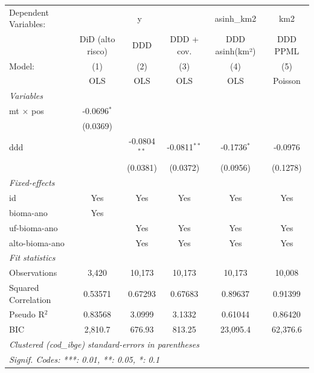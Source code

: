 
\begingroup
\centering
\begin{tabular}{lccccc}
   \tabularnewline \midrule \midrule
   Dependent Variables: & \multicolumn{3}{c}{y} & asinh\_km2 & km2\\
                       & DiD (alto risco) & DDD            & DDD + cov.     & DDD asinh(km²) & DDD PPML \\   
   Model:              & (1)              & (2)            & (3)            & (4)            & (5)\\  
                       &  OLS             & OLS            & OLS            & OLS            & Poisson\\  
   \midrule
   \emph{Variables}\\
   mt $\times$ pos     & -0.0696$^{*}$    &                &                &                &   \\   
                       & (0.0369)         &                &                &                &   \\   
   ddd                 &                  & -0.0804$^{**}$ & -0.0811$^{**}$ & -0.1736$^{*}$  & -0.0976\\   
                       &                  & (0.0381)       & (0.0372)       & (0.0956)       & (0.1278)\\   
   \midrule
   \emph{Fixed-effects}\\
   id                  & Yes              & Yes            & Yes            & Yes            & Yes\\  
   bioma-ano           & Yes              &                &                &                & \\  
   uf-bioma-ano        &                  & Yes            & Yes            & Yes            & Yes\\  
   alto-bioma-ano      &                  & Yes            & Yes            & Yes            & Yes\\  
   \midrule
   \emph{Fit statistics}\\
   Observations        & 3,420            & 10,173         & 10,173         & 10,173         & 10,008\\  
   Squared Correlation & 0.53571          & 0.67293        & 0.67683        & 0.89637        & 0.91399\\  
   Pseudo R$^2$        & 0.83568          & 3.0999         & 3.1332         & 0.61044        & 0.86420\\  
   BIC                 & 2,810.7          & 676.93         & 813.25         & 23,095.4       & 62,376.6\\  
   \midrule \midrule
   \multicolumn{6}{l}{\emph{Clustered (cod\_ibge) standard-errors in parentheses}}\\
   \multicolumn{6}{l}{\emph{Signif. Codes: ***: 0.01, **: 0.05, *: 0.1}}\\
\end{tabular}
\par\endgroup


